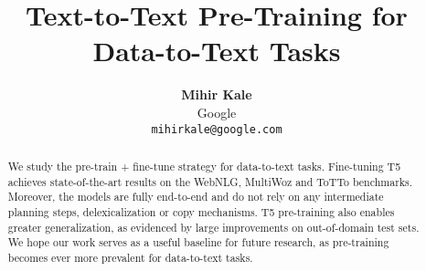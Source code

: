 \documentclass[11pt,a4paper]{article}
\title{\textbf{Text-to-Text Pre-Training for Data-to-Text Tasks}}
\author{\textbf{Mihir Kale} \\
  Google \\
  \texttt{mihirkale@google.com}}
\date{}
\begin{document}
\maketitle
\begin{abstract}
We study the pre-train + fine-tune strategy for data-to-text tasks. Fine-tuning T5 \cite{raffel2019exploring} achieves state-of-the-art results on the WebNLG, MultiWoz and ToTTo benchmarks. Moreover, the models are fully end-to-end and do not rely on any intermediate planning steps, delexicalization or copy mechanisms. T5 pre-training also enables greater generalization, as evidenced by large improvements on out-of-domain test sets. We hope our work serves as a useful baseline for future research, as pre-training becomes ever more prevalent for data-to-text tasks.
\end{abstract}
\end{document}
